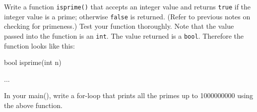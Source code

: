 Write a function \texttt{isprime()} that accepts an integer value and returns \texttt{true} if the integer value is a prime; otherwise \texttt{false} is returned. (Refer to previous notes on checking for primeness.) Test your function thoroughly. Note that the value passed into the function is an \texttt{int}. The value returned is a \texttt{bool}. Therefore the function looks like this:



\begin{consolethree}[escapeinside=||]

bool isprime(int n)

{

    ...

}

\end{consolethree}



In your main(), write a for-loop that prints all the primes up to 1000000000 using the above function.


